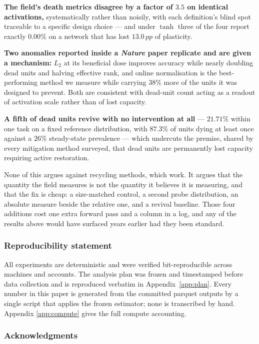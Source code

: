 \documentclass[10pt]{article}
\newcommand{\pp}{\,pp}
\begin{document}
\textbf{The field's death metrics disagree by a factor of $3.5$ on identical
activations,} systematically rather than noisily, with each definition's blind
spot traceable to a specific design choice --- and under $\tanh$ three of the four
report exactly $0.00\%$ on a network that has lost $13.0\pp$ of plasticity.

\textbf{Two anomalies reported inside a \emph{Nature} paper replicate and are
given a mechanism:} $L_2$ at its beneficial dose improves accuracy while nearly
doubling dead units and halving effective rank, and online normalisation is the
best-performing method we measure while carrying $38\%$ more of the units it was
designed to prevent. Both are consistent with dead-unit count acting as a readout
of activation scale rather than of lost capacity.

\textbf{A fifth of dead units revive with no intervention at all} --- $21.71\%$
within one task on a fixed reference distribution, with $87.3\%$ of units dying
at least once against a $26\%$ steady-state prevalence --- which undercuts the
premise, shared by every mitigation method surveyed, that dead units are
permanently lost capacity requiring active restoration.

None of this argues against recycling methods, which work. It argues that the
quantity the field measures is not the quantity it believes it is measuring, and
that the fix is cheap: a size-matched control, a second probe distribution, an
absolute measure beside the relative one, and a revival baseline. Those four
additions cost one extra forward pass and a column in a log, and any of the
results above would have surfaced years earlier had they been standard.

\subsubsection*{Reproducibility statement}

All experiments are deterministic and were verified bit-reproducible across
machines and accounts. The analysis plan was frozen and timestamped before data
collection and is reproduced verbatim in Appendix~\ref{app:plan}. Every number
in this paper is generated from the committed parquet outputs by a single script
that applies the frozen estimator; none is transcribed by hand. Appendix
\ref{app:compute} gives the full compute accounting.

\subsubsection*{Acknowledgments}
\end{document}
